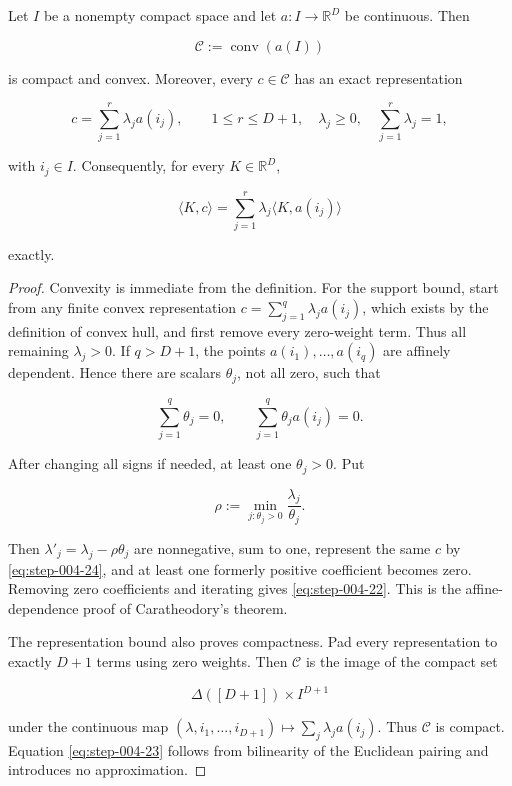 \begin{lemma}\label{lem:step-004-finite-barycenter}
Let \(I\) be a nonempty compact space and let \(a:I\to\mathbb R^D\) be
continuous. Then

\[
\mathcal C:=\operatorname{conv}(a(I))
\]

is compact and convex. Moreover, every \(c\in\mathcal C\) has an exact
representation

\[
c=\sum_{j=1}^r\lambda_j a(i_j),
\qquad
1\le r\le D+1,
\quad
\lambda_j\ge0,
\quad
\sum_{j=1}^r\lambda_j=1,
\tag{S4.22}\label{eq:step-004-22}
\]

with \(i_j\in I\). Consequently, for every \(K\in\mathbb R^D\),

\[
\langle K,c\rangle
=\sum_{j=1}^r\lambda_j\langle K,a(i_j)\rangle
\tag{S4.23}\label{eq:step-004-23}
\]

exactly.
\end{lemma}

\begin{proof}
Convexity is immediate from the definition. For the support bound, start
from any finite convex representation
\(c=\sum_{j=1}^q\lambda_ja(i_j)\), which exists by the definition of convex
hull, and first remove every zero-weight term. Thus all remaining
\(\lambda_j>0\). If \(q>D+1\), the points
\(a(i_1),\ldots,a(i_q)\) are affinely dependent. Hence there are scalars
\(\theta_j\), not all zero, such that

\[
\sum_{j=1}^q\theta_j=0,
\qquad
\sum_{j=1}^q\theta_ja(i_j)=0.
\tag{S4.24}\label{eq:step-004-24}
\]

After changing all signs if needed, at least one \(\theta_j>0\). Put

\[
\rho:=\min_{j:\theta_j>0}\frac{\lambda_j}{\theta_j}.
\]

Then \(\lambda'_j=\lambda_j-\rho\theta_j\) are nonnegative, sum to one,
represent the same \(c\) by \eqref{eq:step-004-24}, and at least one formerly positive
coefficient becomes zero. Removing zero coefficients and iterating gives
\eqref{eq:step-004-22}. This is the affine-dependence proof of Caratheodory's theorem.

The representation bound also proves compactness. Pad every representation
to exactly \(D+1\) terms using zero weights. Then \(\mathcal C\) is the
image of the compact set

\[
\Delta([D+1])\times I^{D+1}
\]

under the continuous map
\((\lambda,i_1,\ldots,i_{D+1})\mapsto
\sum_j\lambda_ja(i_j)\). Thus \(\mathcal C\) is compact. Equation \eqref{eq:step-004-23}
follows from bilinearity of the Euclidean pairing and introduces no
approximation. \end{proof}

